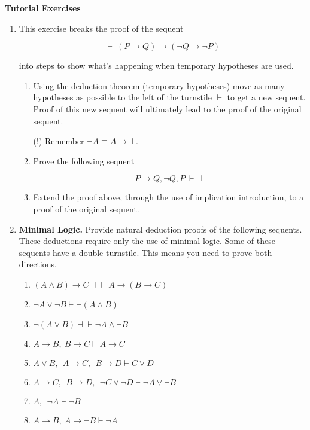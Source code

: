 \documentclass[11pt]{report}
\begin{document}
\newpage
{\bf Tutorial Exercises}
\begin{enumerate}

	\item This exercise breaks the proof of the sequent 
	
	$$\vdash \ (P \to Q) \to (\lnot Q \to \lnot P)$$

	into steps to show what's happening when temporary hypotheses are used. 

	\begin{enumerate}

		\item Using the deduction theorem (temporary hypotheses) move as many hypotheses as possible to the left of the turnstile $\vdash$ to get a new sequent. Proof of this new sequent will ultimately lead to the proof of the original sequent. 
		
		(!) Remember $\lnot A \equiv A \to \bot$.

		\item Prove the following sequent 
		
		$$ P \to Q, \lnot Q, P \ \vdash \ \bot$$

		\item Extend the proof above, through the use of implication introduction, to a proof of the original sequent.

	\end{enumerate}
	
	\item \textbf{Minimal Logic.} Provide natural deduction proofs of the following sequents. These deductions require only the use of minimal logic. Some of these sequents have a double turnstile. This means you need to prove both directions. 
	 
	\begin{enumerate}
		\item $( A\land  B) \rightarrow  C \dashv\vdash  A\rightarrow ( B \rightarrow  C) $
		\item $\lnot A\lor \lnot B \vdash \lnot( A\land  B)$
		\item $\lnot( A\lor  B) \dashv\vdash \lnot  A\land \lnot  B$
		\item $ A\rightarrow  B, \  B \rightarrow  C \vdash  A\rightarrow  C $
		\item $ A\lor  B,\ \  A\to  C,\ \  B \to  D \vdash   C \lor  D$
		\item $ A\to  C,\ \  B \to  D,\ \ \neg C \lor \neg  D \vdash  \neg A\lor \neg  B$
		\item $ A,\ \ \neg  A\vdash  \neg  B$
	   \item $ A\rightarrow B, \  A\rightarrow \lnot B \vdash \lnot  A$
	\end{enumerate}	


\end{enumerate}
\end{document}
